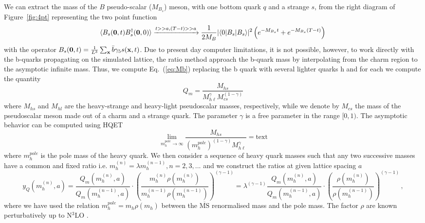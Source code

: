 We can extract the mass of the $B$ pseudo-scalar ($M_{B_s}$) meson, with one bottom quark $q$
and a strange $s$,
from the right diagram of Figure~\ref{fig:4pt} representing the two point function
\begin{equation}
  \langle B_s(\bm{0},t) B_s^\dagger({\bf 0},0)\rangle\xrightarrow{t>>a, (T-t)>>a}
  \frac{1}{2M_B}|\langle 0 | B_s | B_s\rangle|^2\left(e^{-M_{B_s} t}+e^{-M_{B_s}(T-t)}\right)
  \, \label{eq:Mb}
\end{equation}
with the operator $B_s({\bf 0},t)=\frac{1}{L^3}\sum_{\bf x}\bar b\gamma_5 s({\bf x},t)$.
Due to present day computer limitations, it is not possible, however, to work directly
with the b-quarks propagating on the simulated lattice, the ratio method approach the
b-quark mass by interpolating from the charm region to the asymptotic infinite mass.
Thus, we compute Eq.~(\ref{eq:Mb}) replacing the b quark with several lighter quarks h
and for each we compute the quantity
\begin{equation}
  Q_m = \frac{M_{hs}}{M_{h\ell}^\gamma M_{cs}^{(1-\gamma)}}
  \label{eq:ratio_Q}
\end{equation}
where $M_{hs}$ and $M_{hl}$ are the heavy-strange and heavy-light
pseudoscalar masses, respectively, while we denote by $M_{cs}$
the mass of the pseudoscalar meson made out of a charm
and a strange quark. The parameter $\gamma$ is a free parameter in the range  $[0, 1)$.
The asymptotic behavior can be computed using HQET
\begin{equation}
  \lim_{ m^{pole}_h\to \infty}
  \frac{M_{hs}}{( m^{pole}_h)^{(1-\gamma)} M_{h\ell}^\gamma}=\mbox{text}
  \label{eq:yHQFTlim}
\end{equation}
where $ m^{pole}_h$ is the pole mass of the heavy quark.
We then consider a sequence of heavy quark masses such that any two
successive masses have a common and fixed ratio i.e.
$ m_h^{(n)}=\lambda m_h^{(n-1)}, n=2,3,...$ and we construct the ratios
at given lattice spacing $a$
\begin{equation}
  y_Q( m^{(n)}_h,a)=\frac{Q_m( m_h^{(n)},a)}{Q_m( m_h^{(n-1)},a)}\cdot
  \left(\frac{ m_{h}^{(n)} \rho( m_{h}^{(n)})}{ m_{h}^{(n-1)}\rho( m_{h}^{(n-1)})}\right)^{(\gamma-1)}
  =\lambda^{(\gamma-1)}\frac{Q_m( m_h^{(n)},a)}{Q_m( m_h^{(n-1)},a)}\cdot
  \left(\frac{ \rho( m_{h}^{(n)})}{\rho( m_{h}^{(n-1)})}\right)^{(\gamma-1)}\,,
\end{equation}
where we have used the relation  $ m^{pole}_h= m_{h}^{} \rho( m_{h}^{})$
between the $\overline{\mbox{MS}}$ renormalised mass and the pole mass.
The factor $\rho$ are known perturbatively up to N$^3$LO \cite{Chetyrkin:1999pq}.
